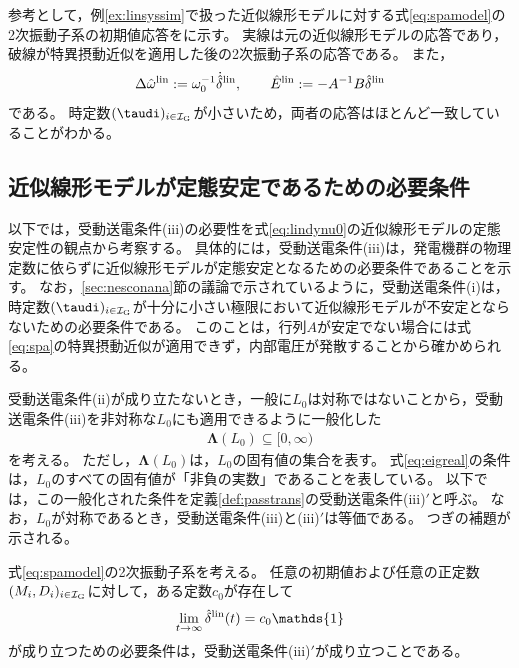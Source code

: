 \documentclass[tombow,dvipdfmx]{corona-a5-1.1}
\begin{document}
\begin{例}[近似線形モデルに対する特異摂動近似]
参考として，例\ref{ex:linsyssim}で扱った近似線形モデルに対する式\ref{eq:spamodel}の2次振動子系の初期値応答をに示す。
実線は元の近似線形モデルの応答であり，破線が特異摂動近似を適用した後の2次振動子系の応答である。
また，
\[\Delta \hat{\omega}^{\rm lin}:=\omega_0^{-1} \dot{\hat{\delta}}^{\rm lin},\qquad
\hat{E}^{\rm lin}:=-A^{-1}B\hat{\delta}^{\rm lin}
\]
である。
時定数$(\taudi )_{i \in \mathcal{I}_{\rm G}}$が小さいため，両者の応答はほとんど一致していることがわかる。
\end{例}

\subsection{近似線形モデルが定態安定であるための必要条件\advanced}\label{sec:nesconsta}

以下では，受動送電条件(iii)の必要性を式\ref{eq:lindynu0}の近似線形モデルの定態安定性の観点から考察する。
具体的には，受動送電条件(iii)は，発電機群の物理定数に依らずに近似線形モデルが定態安定となるための必要条件であることを示す。
なお，\ref{sec:nesconana}節の議論で示されているように，受動送電条件(i)は，時定数$(\taudi)_{i \in \mathcal{I}_{\rm G}}$が十分に小さい極限において近似線形モデルが不安定とならないための必要条件である。
このことは，行列$A$が安定でない場合には式\ref{eq:spa}の特異摂動近似が適用できず，内部電圧が発散することから確かめられる。



受動送電条件(ii)が成り立たないとき，一般に$L_0$は対称ではないことから，受動送電条件(iii)を非対称な$L_0$にも適用できるように一般化した
\begin{align}\label{eq:eigreal}
\bm{\Lambda}(L_0)\subseteq [0,\infty)
\end{align}
を考える。
ただし，$\bm{\Lambda}(L_0)$は，$L_0$の固有値の集合を表す。
式\ref{eq:eigreal}の条件は，$L_0$のすべての固有値が「非負の実数」であることを表している。
以下では，この一般化された条件を定義\ref{def:passtrans}の受動送電条件(iii)$'$と呼ぶ。
なお，$L_0$が対称であるとき，受動送電条件(iii)と(iii)$'$は等価である。
つぎの補題が示される。

\begin{補題}[2次振動子系の定態安定性の必要条件]\label{thm:2ndsys}
式\ref{eq:spamodel}の2次振動子系を考える。
任意の初期値および任意の正定数$(M_i,D_i)_{i \in \mathcal{I}_{\rm G}}$に対して，ある定数$c_0$が存在して
\begin{align}\label{eq:delhat0}
\lim_{t\rightarrow \infty} \hat{\delta}^{\rm lin}(t)= c_0 \mathds{1}
\end{align}
が成り立つための必要条件は，受動送電条件(iii)$'$が成り立つことである。
\end{補題}
\end{document}
